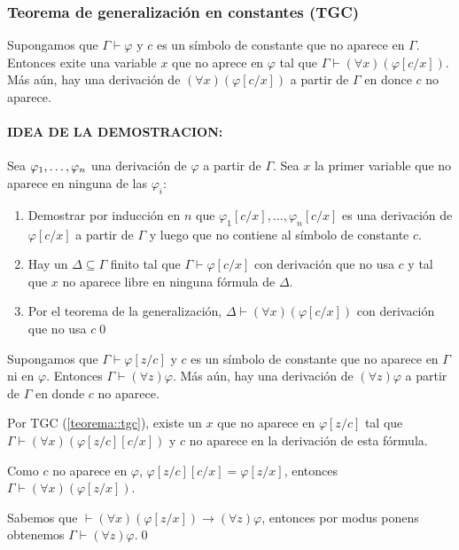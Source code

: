 \subsubsection{Teorema de generalización en constantes (TGC)}
\begin{teorema}\label{teorema::tgc}
	Supongamos que $\Gamma\vdash\varphi$ y $c$ es un símbolo de constante que no aparece en $\Gamma$. Entonces exite una variable $x$ que no aprece en $\varphi$ tal que $\Gamma\vdash(\forall x)(\varphi[c/x])$. Más aún, hay una derivación de $(\forall x)(\varphi[c/x])$ a partir de $\Gamma$ en donce $c$ no aparece.
\end{teorema}
\begin{demo}
	\paragraph{IDEA DE LA DEMOSTRACION:} Sea $\varphi_1,\dots, \varphi_{n}$ una derivación de $\varphi$ a partir de $\Gamma$. Sea $x$ la primer variable que no aparece en ninguna de las $\varphi_i$:
	\begin{enumerate}
		\item Demostrar por inducción en $n$ que $\varphi_1[c/x],\dots,\varphi_n[c/x]$ es una derivación de $\varphi[c/x]$ a partir de $\Gamma$ y luego que no contiene al símbolo de constante $c$.
		\item Hay un $\Delta\subseteq\Gamma$ finito tal que $\Gamma\vdash\varphi[c/x]$ con derivación que no usa $c$ y tal que $x$ no aparece libre en ninguna fórmula de $\Delta$.
		\item Por el teorema de la generalización, $\Delta\vdash(\forall x)(\varphi[c/x])$ con derivación que no usa $c$\qed
	\end{enumerate}
\end{demo}

\begin{corolario}\label{corolario::tgc}
	Supongamos que $\Gamma\vdash\varphi[z/c]$ y $c$ es un símbolo de constante que no aparece en $\Gamma$ ni en $\varphi$. Entonces $\Gamma\vdash(\forall z)\varphi$. Más aún, hay una derivación de $(\forall z)\varphi$ a partir de $\Gamma$ en donde $c$ no aparece.
\end{corolario}

\begin{demo}
	Por TGC (\ref{teorema::tgc}), existe un $x$ que no aparece en $\varphi[z/c]$ tal que $\Gamma\vdash(\forall x)(\varphi[z/c][c/x])$ y $c$ no aparece en la derivación de esta fórmula.
	
	Como $c$ no aparece en $\varphi$, $\varphi[z/c][c/x] = \varphi[z/x]$, entonces $\Gamma\vdash(\forall x)(\varphi[z/x])$.
	
	Sabemos que $\vdash(\forall x)(\varphi[z/x])\to(\forall z)\varphi$, entonces por modus ponens obtenemos $\Gamma\vdash(\forall z)\varphi$.\qed	
\end{demo}


